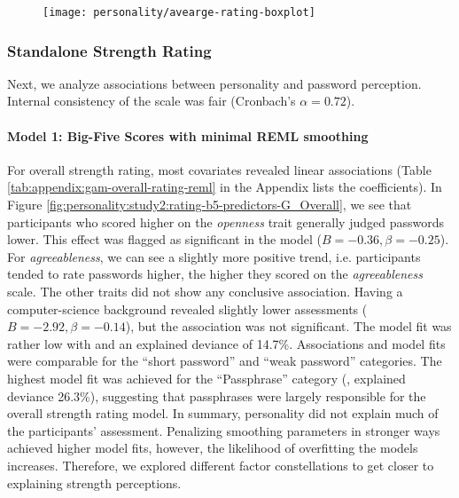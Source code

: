 \begin{figure}[htbp]
	\centering
	\texttt{[image: personality/avearge-rating-boxplot]}
	\caption{\label{fig:personality:study2:average-rating-boxplot}}
\end{figure}

%

\subsubsection{Standalone Strength Rating}
Next, we analyze associations between personality and password perception. Internal consistency of the scale was fair (Cronbach's $\alpha=0.72$). 

\paragraph{Model 1: Big-Five Scores with minimal REML smoothing}
For overall strength rating, most covariates revealed linear associations (Table \ref{tab:appendix:gam-overall-rating-reml} in the Appendix lists the coefficients). In Figure \ref{fig:personality:study2:rating-b5-predictors-G_Overall}, we see that participants who scored higher on the \textit{openness} trait generally judged passwords lower. This effect was flagged as significant in the model ($B=-0.36, \beta=-0.25$). For \textit{agreeableness}, we can see a slightly more positive trend, i.e. participants tended to rate passwords higher, the higher they scored on the \textit{agreeableness} scale. The other traits did not show any conclusive association. Having a computer-science background revealed slightly lower assessments ($B=-2.92, \beta=-0.14$), but the association was not significant. The model fit was rather low with  and an explained deviance of 14.7\%. Associations and model fits were comparable for the ``short password'' and ``weak password'' categories. The highest model fit was achieved for the ``Passphrase'' category (, explained deviance 26.3\%), suggesting that passphrases were largely responsible for the overall strength rating model. In summary, personality did not explain much of the participants' assessment. Penalizing smoothing parameters in stronger ways achieved higher model fits, however, the likelihood of overfitting the models increases. Therefore, we explored different factor constellations to get closer to explaining strength perceptions.

